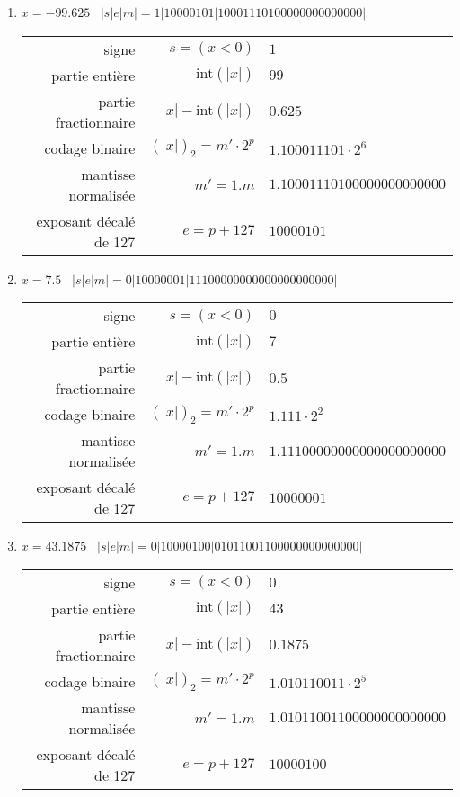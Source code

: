 \documentclass[11pt,a4paper]{article}
\begin{document}
\begin{enumerate}
\item $x = -99.625$ \dotfill\ {$|s|e|m| = 1|10000101|10001110100000000000000|$}
{\footnotesize
\begin{tabular}{r@{ : }r@{ $=$ }l}
signe 					& $s = (x < 0)$ 			& $1$ \\
partie entière 			& $\mbox{int}(|x|)$ 		& $99$ \\
partie fractionnaire 	& $|x| - \mbox{int}(|x|)$ 	& $0.625$ \\
codage binaire 			& $(|x|)_2 = m'\cdot 2^p$   & $1.100011101 \cdot 2^{6}$ \\
mantisse normalisée 	& $m' = 1.m$ 				& $1.10001110100000000000000$ \\
exposant décalé de 127 	& $e = p+127$ 				& $10000101$ \\[2mm]
\end{tabular}
}

\item $x = 7.5$ \dotfill\ {$|s|e|m| = 0|10000001|11100000000000000000000|$}
{\footnotesize
\begin{tabular}{r@{ : }r@{ $=$ }l}
signe 					& $s = (x < 0)$ 			& $0$ \\
partie entière 			& $\mbox{int}(|x|)$ 		& $7$ \\
partie fractionnaire 	& $|x| - \mbox{int}(|x|)$ 	& $0.5$ \\
codage binaire 			& $(|x|)_2 = m'\cdot 2^p$   & $1.111 \cdot 2^{2}$ \\
mantisse normalisée 	& $m' = 1.m$ 				& $1.11100000000000000000000$ \\
exposant décalé de 127 	& $e = p+127$ 				& $10000001$ \\[2mm]
\end{tabular}
}

\item $x = 43.1875$ \dotfill\ {$|s|e|m| = 0|10000100|01011001100000000000000|$}
{\footnotesize
\begin{tabular}{r@{ : }r@{ $=$ }l}
signe 					& $s = (x < 0)$ 			& $0$ \\
partie entière 			& $\mbox{int}(|x|)$ 		& $43$ \\
partie fractionnaire 	& $|x| - \mbox{int}(|x|)$ 	& $0.1875$ \\
codage binaire 			& $(|x|)_2 = m'\cdot 2^p$   & $1.010110011 \cdot 2^{5}$ \\
mantisse normalisée 	& $m' = 1.m$ 				& $1.01011001100000000000000$ \\
exposant décalé de 127 	& $e = p+127$ 				& $10000100$ \\[2mm]
\end{tabular}
}


\end{enumerate}
\end{document}
